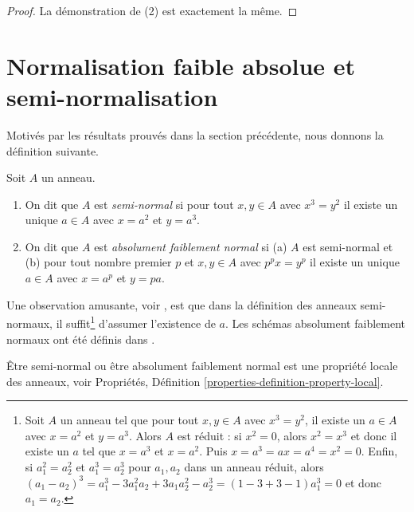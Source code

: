 \begin{proof}
\medskip\noindent La
démonstration de (2) est exactement la même.
\end{proof}







\section{Normalisation faible absolue et semi-normalisation}
\label{section-seminormalization}

\noindent
Motivés par les résultats prouvés dans la section précédente,
nous donnons la définition suivante.

\begin{definition}
\label{definition-seminormal-ring}
Soit $A$ un anneau.
\begin{enumerate}
\item On dit que $A$ est {\it semi-normal} si pour
tout $x, y \in A$ avec $x^3 = y^2$ il existe un unique $a \in A$
avec $x = a^2$ et $y = a^3$.
\item On dit que $A$ est {\it absolument faiblement
normal} si (a) $A$
est semi-normal et (b) pour tout nombre premier $p$ et $x, y \in A$ avec
$p^px = y^p$ il existe un unique $a \in A$ avec $x = a^p$ et $y = pa$.
\end{enumerate}
\end{definition}

\noindent
Une observation amusante, voir \cite{Costa},
est que dans la définition des anneaux semi-normaux, il suffit\footnote{Soit
$A$ un anneau tel que pour tout $x, y \in A$ avec
$x^3 = y^2$, il existe un $a \in A$ avec $x = a^2$ et $y = a^3$.
Alors $A$ est réduit : si $x^2 = 0$, alors $x^2 = x^3$
et donc il existe un $a$ tel que $x = a^3$ et $x = a^2$. Puis
$x = a^3 = ax = a^4 = x^2 = 0$. Enfin, si $a_1^2 = a_2^2$ et $a_1^3 = a_2^3$ pour $a_1, a_2$ dans un
anneau réduit, alors $(a_1 - a_2)^3 = a_1^3 - 3a_1^2a_2 +3a_1a_2^2 - a_2^3 =
(1 - 3 + 3 - 1)a_1^3 = 0$ et donc $a_1 = a_2$.}
d'assumer l'existence de $a$. Les schémas absolument faiblement normaux ont été définis dans \cite[Appendix
B]{rydh_descent}.

\begin{lemma}
\label{lemma-seminormal-local-property}
Être semi-normal ou être absolument faiblement
normal est une propriété locale
des anneaux, voir Propriétés, Définition \ref{properties-definition-property-local}.
\end{lemma}

